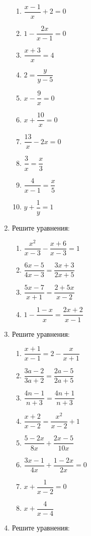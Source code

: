 \documentclass[12pt, a4paper]{article}
\begin{document}
\begin{enumerate}
\begin{multicols}{2}
		\begin{enumerate}[label=\asbuk*)]
			\item $\dfrac{x-1}{x}+2=0$
			\item $1-\dfrac{2x}{x-1}=0$
			\item $\dfrac{x+3}{x}=4$
			\item $2=\dfrac{y}{y-5}$
			\item $x-\dfrac{9}{x}=0$
			\item $x+\dfrac{10}{x}=0$
			\item $\dfrac{13}{x}-2x=0$
			\item $\dfrac{3}{x}=\dfrac{x}{3}$
			\item $\dfrac{4}{x-1}=\dfrac{x}{5}$
			\item $y+\dfrac{1}{y}=1$
		\end{enumerate}
	\end{multicols}
	\item Решите уравнения:
	\begin{multicols}{2}
		\begin{enumerate}[label=\asbuk*)]
			\item $\dfrac{x^2}{x-3}-\dfrac{x+6}{x-3}=1$
			\item $\dfrac{6x-5}{4x-3}=\dfrac{3x+3}{2x+5}$
			\item $\dfrac{5x-7}{x+1}=\dfrac{2+5x}{x-2}$
			\item $1-\dfrac{1-x}{x}=\dfrac{2x+2}{x-1}$
		\end{enumerate}
	\end{multicols}
	\item Решите уравнения:
	\begin{multicols}{2}
		\begin{enumerate}[label=\asbuk*)]
			\item $\dfrac{x+1}{x-1}=2-\dfrac{x}{x+1}$
			\item $\dfrac{3a-2}{3a+2}=\dfrac{2a-5}{2a+5}$
			\item $\dfrac{4n-1}{n+3}=\dfrac{4n+1}{n+3}$
			\item $\dfrac{x+2}{x-2}=\dfrac{x^2}{x-2}+1$
			\item $\dfrac{5-2x}{8x}+\dfrac{2x-5}{10x}$
			\item $\dfrac{3x-1}{4x}+\dfrac{1-2x}{2x}=0$
			\item $x+\dfrac{1}{x-2}=0$
			\item $x+\dfrac{4}{x-4}$
		\end{enumerate}
	\end{multicols}
	\item Решите уравнения:

\end{enumerate}
\end{document}
